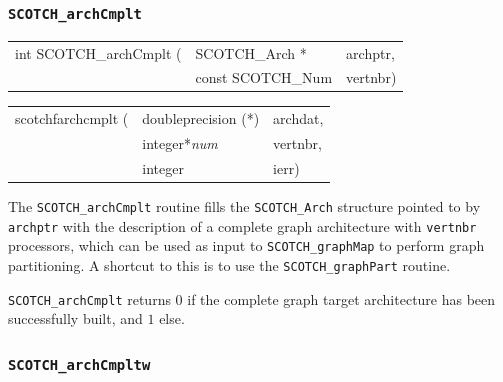 \subsubsection{{\tt SCOTCH\_archCmplt}}

\begin{itemize}
\progsyn

{\tt\begin{tabular}{l@{}ll}
int SCOTCH\_archCmplt ( & SCOTCH\_Arch *    & archptr, \\
                        & const SCOTCH\_Num & vertnbr)
\end{tabular}}

{\tt\begin{tabular}{l@{}ll}
scotchfarchcmplt ( & doubleprecision (*) & archdat, \\
                   & integer*{\it num}   & vertnbr, \\
                   & integer             & ierr)
\end{tabular}}

\progdes

The {\tt SCOTCH\_archCmplt} routine fills the {\tt SCOTCH\_\lbt Arch}
structure pointed to by {\tt archptr} with the description of a complete
graph architecture with {\tt vertnbr} processors, which can be used as
input to {\tt SCOTCH\_\lbt graph\lbt Map} to perform graph partitioning.
A shortcut to this is to use the {\tt SCOTCH\_\lbt graph\lbt Part}
routine.

\progret

{\tt SCOTCH\_archCmplt} returns $0$ if the complete graph target
architecture has been successfully built, and $1$ else.
\end{itemize}

\subsubsection{{\tt SCOTCH\_archCmpltw}}
\label{sec-lib-arch-cmpltw}

